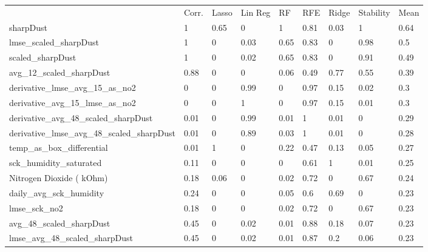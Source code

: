 \begin{table}[H]
\centering
\begin{tabular}{lllllllll}
\\
\\
\toprule
     & Corr. & Lasso & Lin Reg & RF   & RFE  & Ridge & Stability & Mean \\
\midrule
sharpDust                                    & 1     & 0.65       & 0    & 1    & 0.81  & 0.03      & 1    & 0.64 \\
lmse\_scaled\_sharpDust                      & 1     & 0          & 0.03 & 0.65 & 0.83  & 0         & 0.98 & 0.5  \\
scaled\_sharpDust                            & 1     & 0          & 0.02 & 0.65 & 0.83  & 0         & 0.91 & 0.49 \\
avg\_12\_scaled\_sharpDust                   & 0.88  & 0          & 0    & 0.06 & 0.49  & 0.77      & 0.55 & 0.39 \\
derivative\_lmse\_avg\_15\_as\_no2           & 0     & 0          & 0.99 & 0    & 0.97  & 0.15      & 0.02 & 0.3  \\
derivative\_avg\_15\_lmse\_as\_no2           & 0     & 0          & 1    & 0    & 0.97  & 0.15      & 0.01 & 0.3  \\
derivative\_avg\_48\_scaled\_sharpDust       & 0.01  & 0          & 0.99 & 0.01 & 1     & 0.01      & 0    & 0.29 \\
derivative\_lmse\_avg\_48\_scaled\_sharpDust & 0.01  & 0          & 0.89 & 0.03 & 1     & 0.01      & 0    & 0.28 \\
temp\_as\_box\_differential                  & 0.01  & 1          & 0    & 0.22 & 0.47  & 0.13      & 0.05 & 0.27 \\
sck\_humidity\_saturated                     & 0.11  & 0          & 0    & 0    & 0.61  & 1         & 0.01 & 0.25 \\
Nitrogen Dioxide ( kOhm)                     & 0.18  & 0.06       & 0    & 0.02 & 0.72  & 0         & 0.67 & 0.24 \\
daily\_avg\_sck\_humidity                    & 0.24  & 0          & 0    & 0.05 & 0.6   & 0.69      & 0    & 0.23 \\
lmse\_sck\_no2                               & 0.18  & 0          & 0    & 0.02 & 0.72  & 0         & 0.67 & 0.23 \\
avg\_48\_scaled\_sharpDust                   & 0.45  & 0          & 0.02 & 0.01 & 0.88  & 0.18      & 0.07 & 0.23 \\
lmse\_avg\_48\_scaled\_sharpDust             & 0.45  & 0          & 0.02 & 0.01 & 0.87  & 0.2       & 0.06 & 0.23 \\

\end{tabular}
\end{table}
